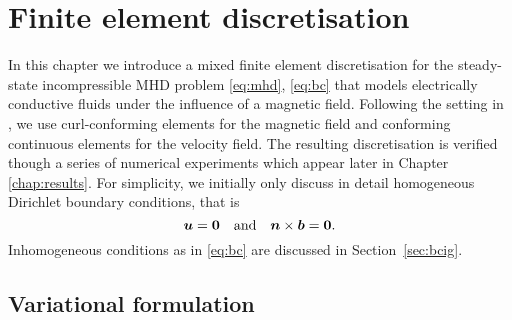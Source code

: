 \chapter{Finite element discretisation}
\label{sec:discretization}

In this chapter we introduce a mixed finite element discretisation for the steady-state incompressible MHD problem \eqref{eq:mhd}, \eqref{eq:bc} that models electrically conductive fluids under the influence of a magnetic field.  Following the setting in \cite{schotzau2004mixed}, we use curl-conforming elements for the magnetic field and conforming continuous elements for the velocity field. The resulting discretisation is verified though a series of numerical experiments which appear later in Chapter \ref{chap:results}. For simplicity, we initially only discuss in detail homogeneous Dirichlet boundary conditions, that is
\begin{equation} \label{eq:homogeneousBC}
    \boldsymbol u = \boldsymbol 0 \quad \mbox{and} \quad \boldsymbol n\times \boldsymbol b = \boldsymbol 0.
\end{equation}
Inhomogeneous conditions as in \eqref{eq:bc}  are  discussed in Section~\ref{sec:bcig}.


\section{Variational formulation}
\label{sec:variation}


